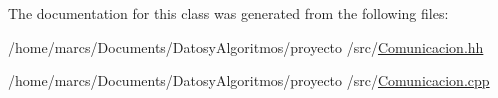 The documentation for this class was generated from the following files\-:\begin{DoxyCompactItemize}
\item 
/home/marcs/\-Documents/\-Datosy\-Algoritmos/proyecto /src/\hyperlink{_comunicacion_8hh}{Comunicacion.\-hh}\item 
/home/marcs/\-Documents/\-Datosy\-Algoritmos/proyecto /src/\hyperlink{_comunicacion_8cpp}{Comunicacion.\-cpp}\end{DoxyCompactItemize}
